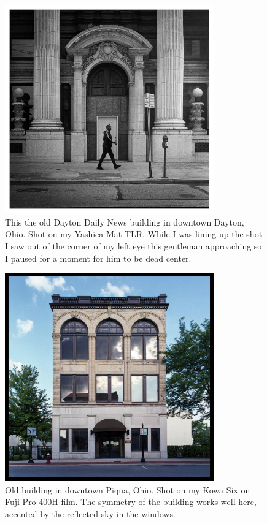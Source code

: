 \documentclass[a4paper]{article}
\begin{document}
\begin{figure}[ht!]
    \centering
    \includegraphics[width=90mm]{img/33898121918_1c5aff9da0_k.jpeg}
    \caption{This the old Dayton Daily News building in downtown Dayton, Ohio. Shot on my Yashica-Mat TLR. While I was lining up the shot I saw out of the corner of my left eye this gentleman approaching so I paused for a moment for him to be dead center.}
\end{figure}

\begin{figure}[ht!]
    \centering
    \includegraphics[width=90mm]{img/50177784312_77ddedaa9c_k.jpeg}
    \caption{Old building in downtown Piqua, Ohio. Shot on my Kowa Six on Fuji Pro 400H film. The symmetry of the building works well here, accented by the reflected sky in the windows.}
\end{figure}
\end{document}
